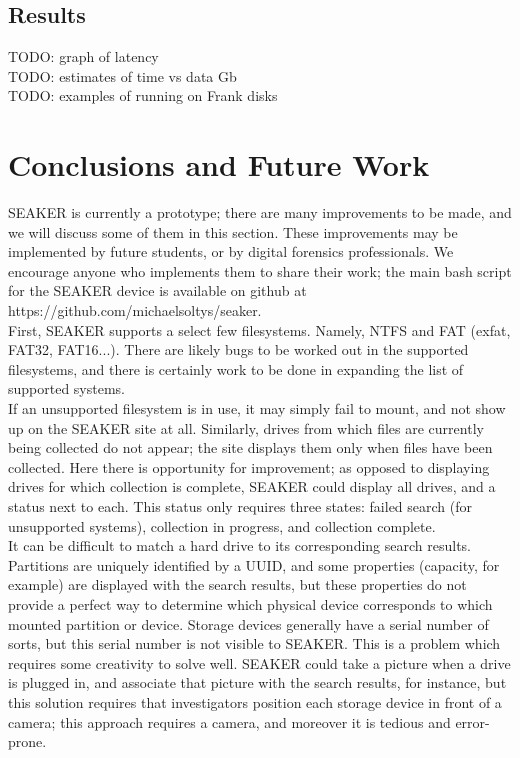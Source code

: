 \documentclass[12pt]{article}
\begin{document}
\subsection{Results}

TODO: graph of latency\\

TODO: estimates of time vs data Gb\\

TODO: examples of running on Frank disks\\


\section{Conclusions and Future Work}
\label{sect-conclusionAndFutureWork}

SEAKER is currently a prototype; there are many improvements to be made, and we will discuss
some of them in this section. These improvements may be implemented by future students, or by digital
forensics professionals. We encourage anyone who implements them to share their work; the main bash
script for the SEAKER device is available on github at https://github.com/michaelsoltys/seaker.\\

First, SEAKER supports a select few filesystems. Namely, NTFS and FAT (exfat, FAT32, FAT16...).
There are likely bugs to be worked out in the supported filesystems, and there is certainly work to be
done in expanding the list of supported systems.\\

If an unsupported filesystem is in use, it may simply fail to mount, and not show up on the SEAKER
site at all. Similarly, drives from which files are currently being collected do not appear; the site displays
them only when files have been collected. Here there is opportunity for improvement; as opposed to
displaying drives for which collection is complete, SEAKER could display all drives, and a status next
to each. This status only requires three states: failed search (for unsupported systems), collection in
progress, and collection complete.\\

It can be difficult to match a hard drive to its corresponding search results. Partitions are uniquely
identified by a UUID, and some properties (capacity, for example) are displayed with the search results,
but these properties do not provide a perfect way to determine which physical device corresponds to
which mounted partition or device. Storage devices generally have a serial number of sorts, but this
serial number is not visible to SEAKER. This is a problem which requires some creativity to solve well.
SEAKER could take a picture when a drive is plugged in, and associate that picture with the search
results, for instance, but this solution requires that investigators position each storage device in front of
a camera; this approach requires a camera, and moreover it is tedious and error-prone.\\
\end{document}
